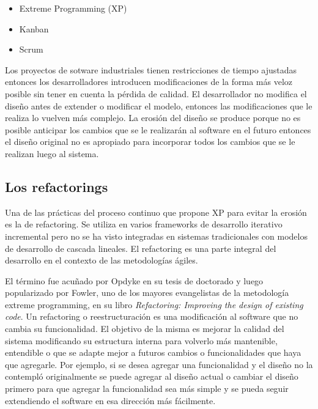 \begin{itemize}
    \item Extreme Programming (XP)
    \item Kanban
    \item Scrum
\end{itemize}

Los proyectos de sotware industriales tienen restricciones de tiempo ajustadas
entonces los desarrolladores introducen modificaciones de la forma más veloz
posible sin tener en cuenta la pérdida de calidad. El desarrollador no modifica
el diseño antes de extender o modificar el modelo, entonces las modificaciones
que le realiza lo vuelven más complejo. La erosión del diseño se produce porque
no es posible anticipar los cambios que se le realizarán al software en el
futuro entonces el diseño original no es apropiado para incorporar todos los
cambios que se le realizan luego al sistema.


\subsection{Los refactorings}
Una de las prácticas del proceso continuo que propone XP para evitar la erosión
es la de refactoring.  Se utiliza en varios frameworks de desarrollo iterativo
incremental pero no se ha visto integradas en sistemas tradicionales con modelos
de desarrollo de cascada lineales. El refactoring es una parte integral del
desarrollo en el contexto de las metodologías ágiles.

El término fue acuñado por Opdyke en su tesis de doctorado y luego popularizado
por Fowler, uno de
los mayores evangelistas de la metodología extreme programming, en su libro
\textit{Refactoring: Improving the design of existing code}. Un refactoring o
reestructuración es una modificación al
software que no cambia su funcionalidad. El objetivo de la misma es mejorar la
calidad del sistema modificando su estructura interna para volverlo más
mantenible, entendible o que se adapte mejor a futuros cambios o funcionalidades
que haya que agregarle. Por ejemplo, si se desea agregar una funcionalidad y el
diseño no la contempló originalmente se puede agregar al diseño actual o cambiar
el diseño primero para que agregar la funcionalidad sea más simple y se pueda
seguir extendiendo el software en esa dirección más fácilmente.



